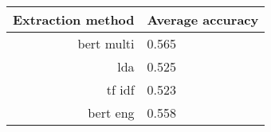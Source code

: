 \begin{tabular}{|r|l|}
  \hline
  Extraction method & Average accuracy \\ 
  \hline
  bert multi & 0.565 \\ 
  \hline
  lda & 0.525 \\ 
  \hline
  tf idf & 0.523 \\ 
  \hline
  bert eng & 0.558 \\ 
  \hline
\end{tabular}
